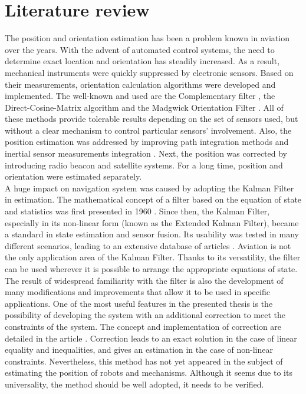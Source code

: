 \chapter{Literature review}

The position and orientation estimation has been a problem known in aviation over the years. With the advent of automated control systems, the need to determine exact location and orientation has steadily increased. As a result, mechanical instruments were quickly suppressed by electronic sensors. Based on their measurements, orientation calculation algorithms were developed and implemented. The well-known and used are the Complementary filter \cite{complementary}, the Direct-Cosine-Matrix algorithm \cite{dcm} and the Madgwick Orientation Filter \cite{madgwick} \cite{Hasan2020}. All of these methods provide tolerable results depending on the set of sensors used, but without a clear mechanism to control particular sensors' involvement.
Also, the position estimation was addressed by improving path integration methods and inertial sensor measurements integration \cite{farrell2012integrated}. Next, the position was corrected by introducing radio beacon and satellite systems. For a long time, position and orientation were estimated separately.\\

A huge impact on navigation system was caused by adopting the Kalman Filter in estimation. The mathematical concept of a filter based on the equation of state and statistics was first presented in 1960 \cite{kalman}. Since then, the Kalman Filter, especially in its non-linear form (known as the Extended Kalman Filter), became a standard in state estimation and sensor fusion. Its usability was tested in many different scenarios, leading to an extensive database of articles \cite{ekf_poor} \cite{s16020264} \cite{s120709566}. Aviation is not the only application area of the Kalman Filter. Thanks to its versatility, the filter can be used wherever it is possible to arrange the appropriate equations of state.\\

The result of widespread familiarity with the filter is also the development of many modifications and improvements that allow it to be used in specific applications. One of the most useful features in the presented thesis is the possibility of developing the system with an additional correction to meet the constraints of the system. The concept and implementation of correction are detailed in the article \cite{simon}. Correction leads to an exact solution in the case of linear equality and inequalities, and gives an estimation in the case of non-linear constraints. Nevertheless, this method has not yet appeared in the subject of estimating the position of robots and mechanisms. Although it seems due to its universality, the method should be well adopted, it needs to be verified.\\

